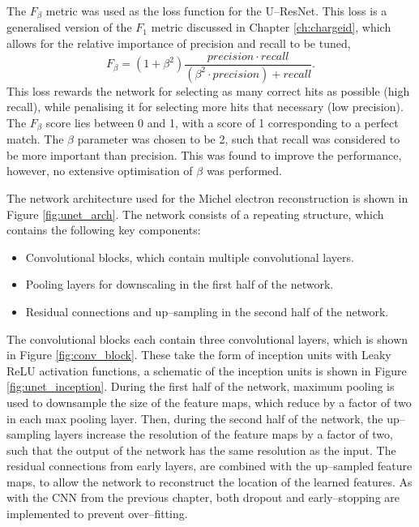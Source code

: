 The $F_\beta$ metric was used as the loss function for the U--ResNet. This loss is
a generalised version of the $F_1$ metric discussed in Chapter
\ref{ch:chargeid}, which allows for the relative importance of precision and
recall to be tuned,
\begin{equation}
	F_\beta = \left( 1 + \beta^2\right) \frac{precision \cdot
	recall}{\left(\beta^2 \cdot precision\right) + recall}.
\end{equation}
This loss rewards the network for selecting as many correct hits as possible
(high recall), while penalising it for selecting more hits that necessary (low
precision). The $F_\beta$ score lies between 0 and 1, with a score of 1
corresponding to a perfect match. The $\beta$ parameter was chosen to be 2, 
such that recall was considered to be more important than precision. This was 
found to improve the performance, however, no extensive optimisation of $\beta$ 
was performed.

The network architecture used for the Michel electron reconstruction is shown in
Figure \ref{fig:unet_arch}. The network consists of a repeating structure, which
contains the following key components:
\begin{itemize}
	\item Convolutional blocks, which contain multiple convolutional layers.
	\item Pooling layers for downscaling in the first half of the network.
	\item Residual connections and up--sampling in the second half of the network.
\end{itemize}
The convolutional blocks each contain three convolutional layers, which is 
shown in Figure \ref{fig:conv_block}. These take the form of inception 
units\cite{Szegedy2015} with Leaky ReLU activation functions, a schematic of 
the inception units is shown in Figure \ref{fig:unet_inception}. During the 
first half of the network, maximum pooling is used to downsample the size of 
the feature maps, which reduce by a factor of two in each max pooling layer. 
Then, during the second half of the network, the up--sampling layers increase 
the resolution of the feature maps by a factor of two, such that the output of 
the network has the same resolution as the input.  The residual connections 
from early layers, are combined with the up--sampled feature maps, to allow 
the network to reconstruct the location of the learned features. As with the 
CNN from the previous chapter, both dropout and early--stopping are 
implemented to prevent over--fitting.

